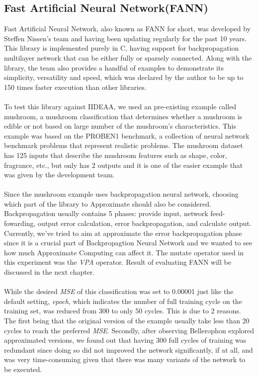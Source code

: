 \subsection{Fast Artificial Neural Network(FANN)}

Fast Artificial Neural Network\cite{fann}, also known as FANN for short, was developed by Steffen Nissen's team and having been updating regularly for the past 10 years. This library is implemented purely in C, having support for backpropagation multilayer network that can be either fully or sparsely connected. Along with the library, the team also provides a handful of examples to demonstrate its simplicity, versatility and speed, which was declared by the author to be up to 150 times faster execution than other libraries. \\
~\\
To test this library against IIDEAA, we used an pre-existing example called mushroom, a mushroom classification that determines whether a mushroom is edible or not based on large number of the mushroom's characteristics. This example was based on the PROBEN1 benchmark, a collection of neural network benchmark problems that represent realistic problems. The mushroom dataset has 125 inputs that describe the mushroom features such as shape, color, fragrance, etc., but only has 2 outputs and it is one of the easier example that was given by the development team. \\
~\\
Since the mushroom example uses backpropagation neural network, choosing which part of the library to Approximate should also be considered. Backpropagation usually contains 5 phases: provide input, network feed-fowarding, output error calculation, error backpropagation, and calculate output. Currently, we've tried to aim at approximate the error backpropagation phase since it is a crucial part of Backpropagtion Neural Network and we wanted to see how much Approximate Computing can affect it. The mutate operator used in this experiment was the \textit{VPA} operator. Result of evaluating FANN will be discussed in the next chapter.\\
~\\
While the desired \textit{MSE} of this classification was set to 0.00001 just like the default setting, \textit{epoch}, which indicates the number of full training cycle on the training set, was reduced from 300 to only 50 cycles. This is due to 2 reasons. The first being that the original version of the example usually take less than 20 cycles to reach the preferred \textit{MSE}. Secondly, after observing Bellerophon explored approximated versions, we found out that having 300 full cycles of training was redundant since doing so did not improved the network significantly, if at all, and was very time-consuming given that there was many variants of the network to be executed. \\
